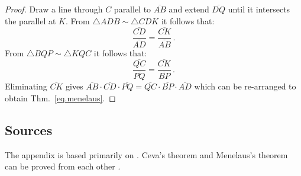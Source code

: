 \begin{proof}
Draw a line through $C$ parallel to $\overline{AB}$ and extend $\overline{DQ}$ until it intersects the parallel at $K$. From $\triangle ADB \sim \triangle CDK$ it follows that:
\begin{equation*}
\displaystyle\frac{\overline{CD}}{\overline{AD}}=\displaystyle\frac{\overline{CK}}{\overline{AB}}\,.
\end{equation*}
From $\triangle  BQP\sim \triangle KQC$ it follows that:
\begin{equation*}
\displaystyle\frac{\overline{QC}}{\overline{PQ}}=\displaystyle\frac{\overline{CK}}{\overline{BP}}\,.
\end{equation*}
Eliminating $\overline{CK}$ gives
$\overline{AB}\cdot\overline{CD}\cdot\overline{PQ}=\overline{QC}\cdot\overline{BP}\cdot\overline{AD}$ which can be re-arranged to obtain Thm.~\ref{eq.menelaus}.
\end{proof}


\subsection*{Sources}

The appendix is based primarily on \cite{gelfand}. Ceva's theorem and Menelaus's theorem can be proved from each other \cite{silvester}.
